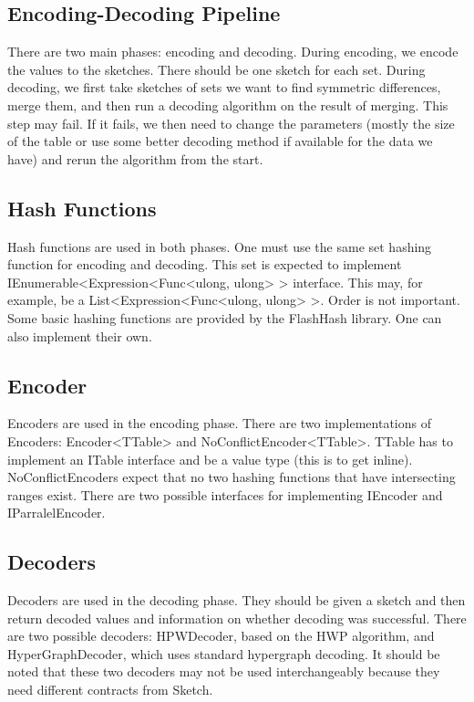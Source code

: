 \subsection{Encoding-Decoding Pipeline}
There are two main phases: encoding and decoding. During encoding, we encode the values to the sketches. There should be one sketch for each set. During decoding, we first take sketches of sets we want to find symmetric differences, merge them, and then run a decoding algorithm on the result of merging. This step may fail. If it fails, we then need to change the parameters (mostly the size of the table or use some better decoding method if available for the data we have) and rerun the algorithm from the start.

\subsection{Hash Functions}
Hash functions are used in both phases. One must use the same set hashing function for encoding and decoding. This set is expected to implement IEnumerable<Expression<Func<ulong, ulong> > interface. This may, for example, be a List<Expression<Func<ulong, ulong> >. Order is not important. Some basic hashing functions are provided by the FlashHash library. One can also implement their own.

\subsection{Encoder}
Encoders are used in the encoding phase. There are two implementations of Encoders: Encoder<TTable> and NoConflictEncoder<TTable>. TTable has to implement an ITable interface and be a value type (this is to get inline). NoConflictEncoders expect that no two hashing functions that have intersecting ranges exist. There are two possible interfaces for implementing IEncoder and IParralelEncoder.

\subsection{Decoders}
Decoders are used in the decoding phase. They should be given a sketch and then return decoded values and information on whether decoding was successful. There are two possible decoders: HPWDecoder, based on the HWP algorithm, and HyperGraphDecoder, which uses standard hypergraph decoding. It should be noted that these two decoders may not be used interchangeably because they need different contracts from Sketch.


